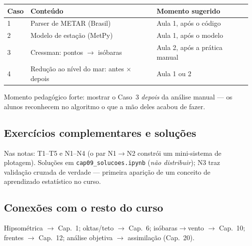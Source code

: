 \begin{center}
\begin{tabular}{lll}
\hline
Caso & Conteúdo & Momento sugerido \\
\hline
1 & Parser de METAR (Brasil) & Aula 1, após o código \\
2 & Modelo de estação (MetPy) & Aula 1, após o modelo \\
3 & Cressman: pontos $\to$ isóbaras & Aula 2, após a prática manual \\
4 & Redução ao nível do mar: antes × depois & Aula 1 ou 2 \\
\hline
\end{tabular}
\end{center}

Momento pedagógico forte: mostrar o Caso~3 \emph{depois} da análise manual
— os alunos reconhecem no algoritmo o que a mão deles acabou de fazer.

\subsection*{Exercícios complementares e soluções}

Nas notas: T1--T5 e N1--N4 (o par N1$\to$N2 constrói um mini-sistema de
plotagem). Soluções em \texttt{cap09\_solucoes.ipynb}
(\emph{não distribuir}); N3 traz validação cruzada de verdade — primeira
aparição de um conceito de aprendizado estatístico no curso.

\subsection*{Conexões com o resto do curso}

Hipsométrica $\to$ Cap.~1; oktas/teto $\to$ Cap.~6; isóbaras$\to$vento
$\to$ Cap.~10; frentes $\to$ Cap.~12; análise objetiva $\to$ assimilação
(Cap.~20).
